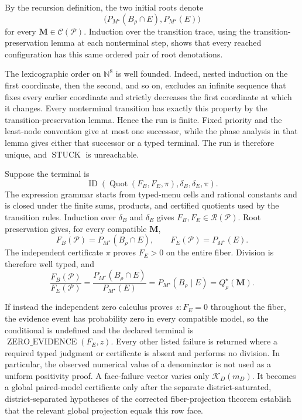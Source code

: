 By the recursion definition, the two initial roots denote
\[
\bigl(P_{M^\star}(B_\rho\cap E),P_{M^\star}(E)\bigr)
\]
for every \(\mathbf M\in\mathcal C(\mathcal P)\).  Induction over the transition trace, using the transition-preservation lemma at each nonterminal step, shows that every reached configuration has this same ordered pair of root denotations.

The lexicographic order on \(\mathbb N^8\) is well founded.  Indeed, nested induction on the first coordinate, then the second, and so on, excludes an infinite sequence that fixes every earlier coordinate and strictly decreases the first coordinate at which it changes.  Every nonterminal transition has exactly this property by the transition-preservation lemma.  Hence the run is finite.  Fixed priority and the least-node convention give at most one successor, while the phase analysis in that lemma gives either that successor or a typed terminal.  The run is therefore unique, and \(\operatorname{STUCK}\) is unreachable.

Suppose the terminal is
\[
\operatorname{ID}(\operatorname{Quot}(F_B,F_E,\pi),\delta_B,\delta_E,\pi).
\]
The expression grammar starts from typed-menu cells and rational constants and is closed under the finite sums, products, and certified quotients used by the transition rules.  Induction over \(\delta_B\) and \(\delta_E\) gives \(F_B,F_E\in\mathscr R(\mathcal P)\).  Root preservation gives, for every compatible \(\mathbf M\),
\[
F_B(\mathcal P)=P_{M^\star}(B_\rho\cap E),
\qquad
F_E(\mathcal P)=P_{M^\star}(E).
\]
The independent certificate \(\pi\) proves \(F_E>0\) on the entire fiber.  Division is therefore well typed, and
\[
\frac{F_B(\mathcal P)}{F_E(\mathcal P)}
=\frac{P_{M^\star}(B_\rho\cap E)}{P_{M^\star}(E)}
=P_{M^\star}(B_\rho\mid E)
=Q_\rho^\star(\mathbf M).
\]

If instead the independent zero calculus proves \(z:F_E=0\) throughout the fiber, the evidence event has probability zero in every compatible model, so the conditional is undefined and the declared terminal is \(\operatorname{ZERO\_EVIDENCE}(F_E,z)\).  Every other listed failure is returned where a required typed judgment or certificate is absent and performs no division.  In particular, the observed numerical value of a denominator is not used as a uniform positivity proof.  A face-failure vector varies only \(\mathcal K_D(m_D)\).  It becomes a global paired-model certificate only after the separate district-saturated, district-separated hypotheses of the corrected fiber-projection theorem establish that the relevant global projection equals this row face.